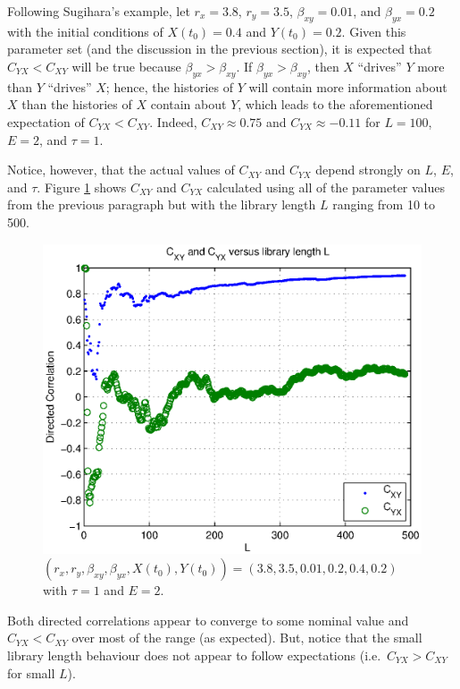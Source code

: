 \documentclass[a4paper,11pt]{article}
\begin{document}
Following Sugihara's example, let $r_x=3.8$, $r_y=3.5$, $\beta_{xy}=0.01$, and $\beta_{yx}=0.2$ with the initial conditions of $X(t_0) = 0.4$ and $Y(t_0)=0.2$.  Given this parameter set (and the discussion in the previous section), it is expected that $C_{YX}<C_{XY}$ will be true because $\beta_{yx}>\beta_{xy}$.  If $\beta_{yx}>\beta_{xy}$, then $X$ ``drives'' $Y$ more than $Y$ ``drives'' $X$; hence, the histories of $Y$ will contain more information about $X$ than the histories of $X$ contain about $Y$, which leads to the aforementioned expectation of $C_{YX}<C_{XY}$.  Indeed, $C_{XY}\approx 0.75$ and $C_{YX}\approx -0.11$ for $L=100$, $E=2$, and $\tau = 1$.

Notice, however, that the actual values of $C_{XY}$ and $C_{YX}$ depend strongly on $L$, $E$, and $\tau$.  Figure \ref{fig:CxyCyxVL} shows $C_{XY}$ and $C_{YX}$ calculated using all of the parameter values from the previous paragraph but with the library length $L$ ranging from 10 to 500.
\begin{figure}[h!t]
\centering
\label{fig:CxyCyxVL}
\includegraphics[scale=0.55]{graphics/CxyCyxVL.eps}
\caption{$\left(r_x,r_y,\beta_{xy},\beta_{yx},X(t_0),Y(t_0)\right) = \left(3.8,3.5,0.01,0.2,0.4,0.2\right)$ with $\tau=1$ and $E=2$.}
\end{figure}
Both directed correlations appear to converge to some nominal value and $C_{YX}<C_{XY}$ over most of the range (as expected).  But, notice that the small library length behaviour does not appear to follow expectations (i.e.\ $C_{YX}>C_{XY}$ for small $L$).
\end{document}
